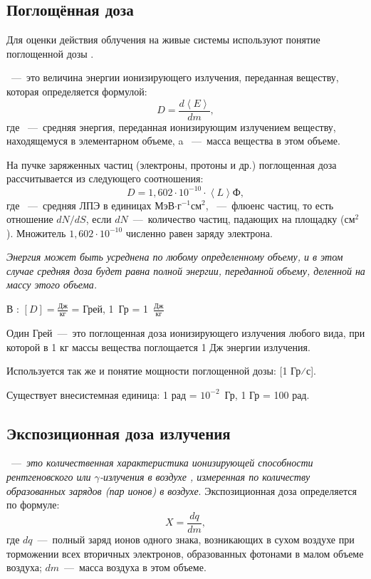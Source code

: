 \documentclass[a4paper, 14pt]{article}
\renewcommand{\emph}[1]{{\color{orange}{\textit{\textbf{#1}}}}}
\begin{document}
\subsection{Поглощённая доза}
Для оценки действия облучения на живые системы используют понятие
поглощенной дозы \emph{D}.

\emph{D}~---~это величина энергии ионизирующего излучения, переданная веществу, которая определяется формулой:
\begin{equation}
    D = \frac{d\left\langle E \right\rangle }{dm},
\end{equation}
где \emph{d$\left\langle E \right\rangle$}~---~средняя энергия, переданная ионизирующим излучением веществу, находящемуся в элементарном объеме, a \emph{dm}~---~масса вещества в этом объеме.

На пучке заряженных частиц (электроны, протоны и др.) поглощенная доза
рассчитывается из следующего соотношения: 
\begin{equation} \label{adsorbDoze}
    D = 1,602\cdot 10^{-10}\cdot \left\langle L \right\rangle\text{Ф},
\end{equation}
где \emph{$\left\langle L \right\rangle$}~---~средняя ЛПЭ
в единицах МэВ$\cdot \text{г}^{-1}\text{см}^2$, \emph{Ф}~---~флюенс частиц, то есть отношение $dN/dS$, если $dN$~---~количество частиц, падающих на площадку \emph{dS} (см$^2$). Множитель $1,602\cdot 10^{-10}$ численно равен заряду электрона.

\textit{Энергия может быть усреднена по любому определенному объему, и в этом
случае средняя доза будет равна полной энергии, переданной объему, деленной на
массу этого объема.}

В \emph{СИ}: $[D] = \frac{\text{Дж}}{\text{кг}}$ = Грей, 1~Гр = 1~$\frac{\text{Дж}}{\text{кг}}$

Один Грей~---~это поглощенная доза ионизирующего излучения любого вида, при
которой в 1 кг массы вещества поглощается 1 Дж энергии излучения.

Используется так же и понятие мощности поглощенной дозы: [1 Гр⁄с].

Существует внесистемная единица: 1 рад = $10^{-2}$~Гр, 1 Гр = 100 рад.

\subsection{Экспозиционная доза излучения}
\emph{Экспозиционная доза (X)}~---~\textit{это количественная характеристика ионизирующей
способности рентгеновского или $\gamma$-излучения в воздухе 
, измеренная по количеству образованных зарядов (пар
ионов) в воздухе}. Экспозиционная доза определяется по формуле:
\begin{equation}
    X = \frac{dq}{dm},
\end{equation}
где $dq$~---~полный заряд ионов одного знака,
возникающих в сухом воздухе при торможении всех вторичных электронов,
образованных фотонами в малом объеме воздуха; $dm$~---~масса воздуха в этом объеме.
\end{document}
